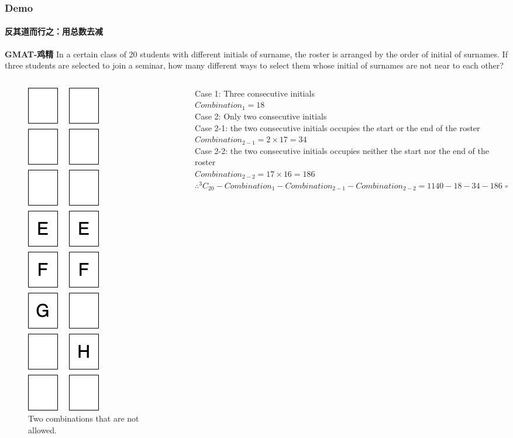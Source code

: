 \documentclass[
	11pt, %
]{beamer}
\begin{document}
\begin{frame}
	\frametitle{Demo}
	\framesubtitle{反其道而行之：用总数去减}
\textbf{GMAT-鸡精} In a certain class of 20 students with different initials of surname, the roster is arranged by the order of initial of surnames. If three students are selected to join a
seminar, how many different ways to select them whose initial of surnames are not
near to each other?
	\begin{columns}[t] 
		\begin{column}{0.3\textwidth} %
				\begin{figure}
				\includegraphics[width=0.2\linewidth]{Surnames.png}
				\caption{Two combinations that are not allowed.}
				\end{figure}		
		\end{column}
		\begin{column}{0.7\textwidth} %
		Case 1: Three consecutive initials\\
		$Combination_1 = 18$\\
		\bigskip
		Case 2: Only two consecutive initials \\
		Case 2-1: the two consecutive initials occupies the start or the end of the roster\\
		$Combination_{2-1} = 2 \times 17 = 34$\\
		Case 2-2: the two consecutive initials occupies neither the start nor the end of the roster\\
		$Combination_{2-2} = 17 \times 16 = 186$\\
		$\therefore ^3C_{20} - Combination_1 -Combination_{2-1} - Combination_{2-2} = 1140 - 18 - 34 - 186 = \textbf{902}$
		\end{column}
	\end{columns}
\end{frame}
\end{document}
